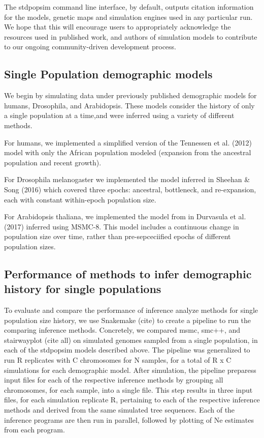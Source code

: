 \documentclass[12pt,halfline,a4paper]{ouparticle}
\begin{document}
The stdpopsim command line interface, by default, outputs citation information
for the models, genetic maps and simulation engines used in any particular run.
We hope that this will encourage users to appropriately acknowledge the
resources used in published work, and authors
of simulation models to contribute to our ongoing community-driven development process.

\subsection*{Single Population demographic models}
We begin by simulating data under previously published demographic models for
humans, Drosophila, and Arabidopsis. These models consider the history of only a
single population at a time,and  were inferred using a variety of different
methods.

For humans, we implemented a simplified version of the Tennessen et al. (2012)
model with only the African population modeled (expansion from the ancestral
population and recent growth).

For Drosophila melanogaster we implemented the model inferred in Sheehan & Song
(2016) which covered three epochs: ancestral, bottleneck, and re-expansion, each
with constant within-epoch population size.

For Arabidopsis thaliana, we implemented the model from in Durvasula et al.
(2017) inferred using MSMC-8. This model includes a continuous change in
population size over time, rather than pre-sepceciified epochs of different
population sizes.

\subsection*{Performance of methods to infer demographic history for single
populations}
To evaluate and compare the performance of inference analyze methods for single
population size history, we use Snakemake (cite) to create a pipeline to run the
comparing inference methods. Concretely, we compared msmc, smc++, and
stairwayplot (cite all) on simulated genomes sampled from a single population,
in each of the stdpopsim models described above. The pipeline was generalized to
run R replicates with C chromosomes for N samples, for a total of R x C
simulations for each demographic model. After simulation, the pipeline preparess
input files for each of the respective inference methods by grouping all
chromosomes, for each sample, into a single file. This step results in three
input files, for each simulation replicate R, pertaining to each of the
respective inference methods and derived from the same simulated tree sequences.
Each of the inference programs are then run in parallel, followed by plotting of
Ne estimates from each program.
\end{document}
